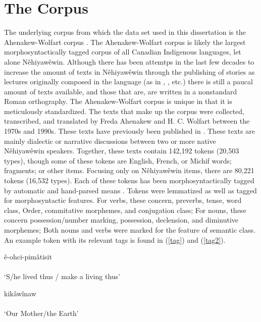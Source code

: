 \section{The Corpus}
The underlying corpus from which the data set used in this dissertation is the Ahenakew-Wolfart corpus \citep{arppe1945morphosyntactically}. The Ahenakew-Wolfart corpus is likely the largest morphosyntactically tagged corpus of all Canadian Indigenous languages, let alone Nêhiyawêwin. Although there has been attemtps in the last few decades to increase the amount of texts in Nêhiyawêwin through the publishing of stories as lectures originally composed in the language (as in \citet {AhenakewAlice2000}, \citet{Masuskapoe2010piko}, etc.) there is still a paucal amount of texts available, and those that are, are written in a nonstandard Roman orthography. The Ahenakew-Wolfart corpus is unique in that it is meticulously standardized. The texts that make up the corpus were collected, transcribed, and translated by Freda Ahenakew and H. C. Wolfart between the 1970s and 1990s. These texts have previously been published in \citet{AhenakewAlice2000, Bearetal1992, KaNipitehtew1998, Masuskapoe2010piko, Minde1997kwayask, VandallDouquette1987,Whitecalf1993}. These texts are mainly dialectic or narrative discussions between two or more native Nêhiyawêwin speakers. Together, these texts contain 142,192 tokens (20,503 types), though some of these tokens are English, French, or Michif words; fragments; or other items. Focusing only on Nêhiyawêwin items, there are 80,221 tokens (16,532 types). Each of these tokens has been morphosyntactically tagged by automatic and hand-parsed means \citep{arppe1945morphosyntactically}. Tokens were lemmatized as well as tagged for morphosyntactic features. For verbs, these concern, preverbs, tense, word class, Order, commitative morphemes, and conjugation class; For nouns, these concern possession/number marking, possession, declension, and diminutive morphemes; Both nouns and verbs were marked for the feature of semantic class. An example token with its relevant tags is found in (\ref{tag}) and (\ref{tag2}).

\begin{exe}
\ex
\gll ê-ohci-pimâtisit \\
 \\
\trans `S/he lived thus / make a living thus'
\label{tag}
\end{exe}

\begin{exe}
\ex
\gll kikâwînaw \\
 \\
\trans `Our Mother/the Earth'
\label{tag}
\end{exe}

